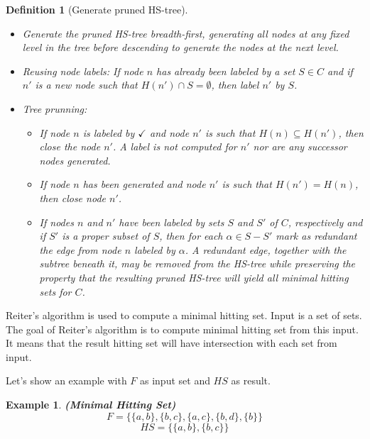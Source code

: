 \documentclass[12pt,a4paper]{article}
\newtheorem{definition}{Definition}[subsection]
\newtheorem{example}{Example}[subsection]
\begin{document}
\begin{definition}[Generate pruned HS-tree]{\indent}
	\begin{itemize}
		\item Generate the pruned HS-tree breadth-first, generating all nodes at any fixed level in the tree before descending to generate the nodes at the next level.
		
		\item Reusing node labels: If node $n$ has already been labeled by a set $S \in C$ and if $n'$ is a new node such that $H(n') \cap S = \emptyset$, then label $n'$ by $S$.
		
		\item Tree prunning:
		
		\begin{itemize}
			\item If node $n$ is labeled by $\checkmark$ and node $n'$ is such that $H(n) \subseteq H(n')$, then close the node $n'$. A label is not computed for $n'$ nor are any successor nodes generated.
			
			\item If node $n$ has been generated and node $n'$ is such that $H(n') = H(n)$, then close node $n'$.
			
			\item If nodes $n$ and $n'$ have been labeled by sets $S$ and $S'$ of $C$, respectively and if $S'$ is a proper subset of $S$, then for each $\alpha \in S - S'$ mark as redundant the edge from node $n$ labeled by $\alpha$. A redundant edge, together with the subtree beneath it, may be removed from the HS-tree while preserving the property that the resulting pruned HS-tree will yield all minimal hitting sets for $C$.
			
		\end{itemize}	
		
	\end{itemize}
	
\end{definition}

Reiter's algorithm is used to compute a minimal hitting set. Input is a set of sets. The goal of Reiter's algorithm is to compute minimal hitting set from this input. It means that the result hitting set will have intersection with each set from input.

Let's show an example with $F$ as input set and $HS$ as result.

\begin{example}{\textbf{(Minimal Hitting Set)}}
	\[  F = \{ \{a,b\}, \{b,c\}, \{a,c\}, \{b,d\}, \{b\} \} \]
	\[ HS = \{ \{a,b\}, \{b,c\} \} \]
\end{example}
\end{document}
